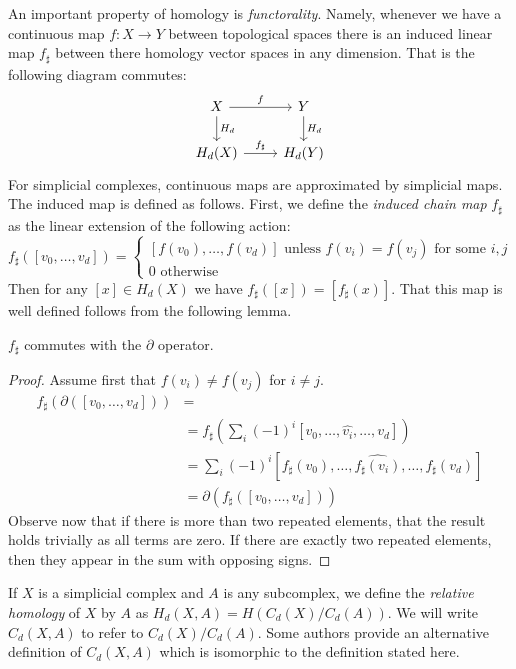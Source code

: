 An important property of homology is \emph{functorality}. Namely, whenever we have a continuous map $f: X \rightarrow Y$ between topological spaces there is an induced linear map $f_\sharp$ between there homology vector spaces in any dimension. That is the following diagram commutes:
\[ \begin{tikzcd}
X \arrow{r}{f}\arrow{d}{H_d} & Y \arrow{d}{H_d} \\
H_d(X) \arrow{r}{f_{\sharp}} & H_d(Y)
\end{tikzcd} \]
For simplicial complexes, continuous maps are approximated by simplicial maps. The induced map is defined as follows. First, we define the \emph{induced chain map} $f_\sharp$ as the linear extension of the following action: 
\[ f_\sharp([v_0, \ldots, v_d]) = 
\begin{cases} 
    [f(v_0), \ldots, f(v_d)] \textrm{ unless } f(v_i) = f(v_j) \textrm{ for some } i,j \\
    0 \textrm{ otherwise}
   \end{cases}
\]
Then for any $[x] \in H_d(X)$ we have $f_\sharp([x]) = [f_{\sharp}(x)]$.  That this map is well defined follows from 
the following lemma.
\begin{lemma}
$f_\sharp$ commutes with the $\partial$ operator. 
\end{lemma}
\begin{proof}
Assume first that $f(v_i) \neq f(v_j)$ for $i \neq j$.
\begin{align*}
f_\sharp(\partial([v_0, \ldots, v_d])) &= \\
&= f_{\sharp}(\sum_i (-1)^i[v_0, \ldots, \hat{v_i}, \ldots, v_d])  \\
&=  \sum_i(-1)^i [f_{\sharp}(v_0), \ldots, \widehat{f_{\sharp}(v_i)}, \ldots, f_{\sharp}(v_d)] \\
&=  \partial(f_\sharp([v_0, \ldots, v_d]))
\end{align*}
Observe now that if there is more than two repeated elements, that the result holds trivially as all terms are zero. If there are exactly two repeated elements, then they appear
in the sum with opposing signs.
\end{proof}

If $X$ is a simplicial complex and $A$ is any subcomplex, we define the \emph{relative homology} of $X$ by $A$ as $H_d(X,A) = H(C_d(X)/C_d(A))$. We will write $C_d(X,A)$ to refer to $C_d(X)/C_d(A)$.  Some authors provide an alternative definition of $C_d(X,A)$ which is isomorphic to the definition stated here.

